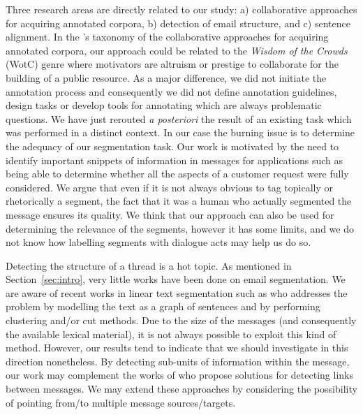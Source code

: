 Three research areas are directly related to our study:
a) collaborative approaches for acquiring
annotated corpora, b) detection of email structure, and c) sentence alignment.
%
In the \cite{wang:2013:lre}'s taxonomy of the collaborative approaches for acquiring annotated corpora, our approach could be related to the \textit{Wisdom of the Crowds} (WotC) genre where motivators are altruism or prestige to collaborate for the building of a public resource.
As a major difference, we did not initiate the annotation process and consequently we did not define annotation guidelines, design tasks or develop tools for annotating which are always problematic questions.
We have just rerouted \textit{a posteriori} the result of an existing task which was performed in a distinct context.
In our case the burning issue is to determine the adequacy of our segmentation task.
Our work is motivated by the need to identify important snippets of information in messages for applications such as being able to determine whether all the aspects of a customer request were fully considered.
We argue that even if it is not always obvious to tag topically or rhetorically a segment, the fact that it was a human who actually segmented the message ensures its quality.
%
%
We think that our approach can also be used for determining the relevance of the segments, however it has some limits, and we do not know how labelling segments with dialogue acts may help us do so.

Detecting the structure of a thread is a hot topic. 
%
As mentioned in Section~\ref{sec:intro}, very little works have been done on email segmentation. 
We are aware of recent works in linear text segmentation such as \cite{kazantseva:2011} who addresses the problem by modelling the text as a graph of sentences and by performing clustering and/or cut methods. 
%
Due to the size of the messages (and consequently the available lexical material), it is not always possible to exploit this kind of method. However, our results tend to indicate that we should investigate in this direction nonetheless.
%
By detecting sub-units of information within the message, our work may complement the works of \cite{li:2011:threadlinking,kim:2010:taggingandlinking} who propose solutions for detecting links between messages. 
We may extend these approaches by considering the possibility of pointing from/to multiple message sources/targets. %

